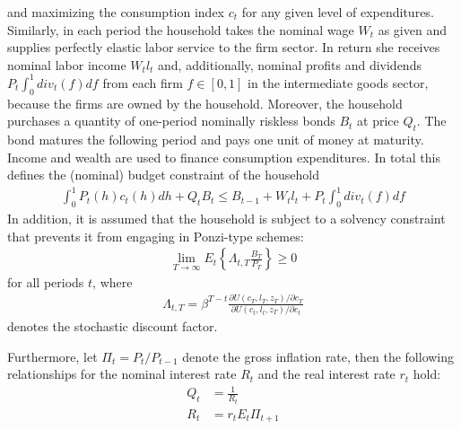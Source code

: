   and maximizing the consumption index \(c_t\) for any given level of expenditures.
Similarly, in each period the household takes the nominal wage \(W_t\) as given and supplies perfectly elastic labor service to the firm sector.
In return she receives nominal labor income \(W_t l_t\) and, additionally,
  nominal profits and dividends \(P_t \int_0^1 {div}_t(f)df\) from each firm \(f\in[0,1]\) in the intermediate goods sector,
  because the firms are owned by the household.
Moreover, the household purchases a quantity of one-period nominally riskless bonds \(B_t\) at price \(Q_t\).
The bond matures the following period and pays one unit of money at maturity.
Income and wealth are used to finance consumption expenditures.
In total this defines the (nominal) budget constraint of the household
\begin{align*}
\int_0^1 P_t(h) c_t(h) dh + Q_t B_t \leq B_{t-1} + W_t l_t + P_t \int_0^1 div_t(f) df
\end{align*}
In addition, it is assumed that the household is subject to a solvency constraint that prevents it from engaging in Ponzi-type schemes:
\begin{align*}
\lim_{T \rightarrow \infty} E_t \left \{ \Lambda_{t,T} \frac{B_T}{P_T }\right \} \geq 0
\end{align*}
for all periods \(t\), where
\begin{align}
\Lambda_{t,T} = \beta^{T-t} \frac{\partial{U(c_{T},l_{T},z_T)}/\partial c_T}{\partial{U(c_{t},l_{t},z_T)}/\partial c_t} \label{eq:StochasticDiscountFactor}
\end{align}
denotes the stochastic discount factor.

Furthermore, let \(\Pi_t=P_t/P_{t-1}\) denote the gross inflation rate,
  then the following relationships for the nominal interest rate \(R_t\) and the real interest rate \(r_t\) hold:
\begin{align}
Q_t &= \frac{1}{R_t} \label{eq:NominalInterestRate}
\\
R_t &= r_t E_t \Pi_{t+1} \label{eq:RealInterestRate}
\end{align}

